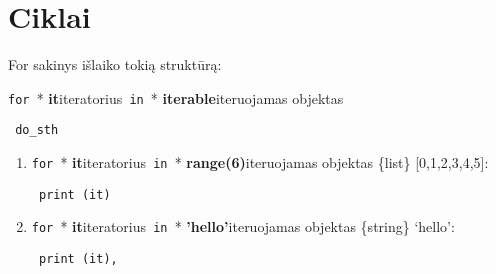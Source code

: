 \documentclass[a4paper]{article}
\begin{document}
\section{Ciklai}
\begin{framed}
For sakinys išlaiko tokią struktūrą:

\texttt{for }\tooltip**{\textbf{ it}}{iteratorius}\texttt{ in }\tooltip**{\textbf{ iterable}}{iteruojamas objektas}

\texttt{    do_sth}
\end{framed}

\begin{enumerate}
\item \texttt{for }\tooltip**{\textbf{ it}}{iteratorius}\texttt{ in }\tooltip**{\textbf{ range(6)}}{iteruojamas objektas \{list\} [0,1,2,3,4,5]}: 

\texttt{    print (it)}

\item \texttt{for }\tooltip**{\textbf{ it}}{iteratorius}\texttt{ in }\tooltip**{\textbf{ 'hello'}}{iteruojamas objektas \{string\} `hello'}: 

\texttt{    print (it),}
\end{enumerate}
\end{document}
